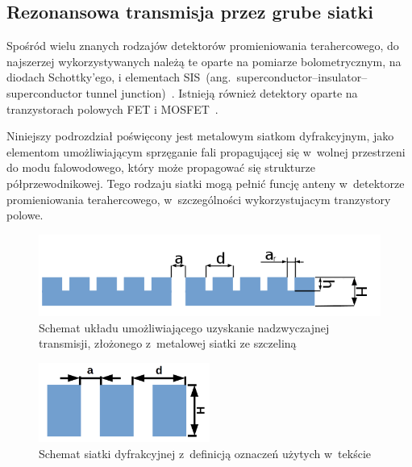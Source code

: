 \subsection{Rezonansowa transmisja przez grube siatki}
Spośród wielu znanych rodzajów detektorów promieniowania terahercowego, do najszerzej wykorzystywanych należą te oparte na pomiarze bolometrycznym, na diodach Schottky'ego, i elementach SIS~(ang.~superconductor–insulator–superconductor tunnel junction)~\cite{sizov2010thz}. Istnieją również detektory oparte na tranzystorach polowych FET i MOSFET~\cite{knap2002nonresonant,kopyt2015parasitic}.

Niniejszy podrozdział poświęcony jest metalowym siatkom dyfrakcyjnym, jako elementom umożliwiającym sprzęganie fali propagującej się w~wolnej przestrzeni do modu falowodowego, który może propagować się strukturze półprzewodnikowej. Tego rodzaju siatki mogą pełnić funcję anteny w~detektorze promieniowania terahercowego, w~szczególności wykorzystujacym tranzystory polowe. 
\label{subart:rezo-grating}

\begin{figure}[tb]
	\centering
	\includegraphics[width=1.0\textwidth]{images/thz/schemat-1szczelina.png}
	\caption{Schemat układu umożliwiającego uzyskanie nadzwyczajnej transmisji, złożonego z~metalowej siatki ze szczeliną}
	\label{fig:szczelina-schem}
\end{figure}

\begin{figure}
	\includegraphics[width=0.5\textwidth]{images/thz/schemat-siatka.png}
	\caption{Schemat siatki dyfrakcyjnej z~definicją oznaczeń użytych w~tekście}
	\centering
	\label{fig:rezo-siat-H}
\end{figure}

